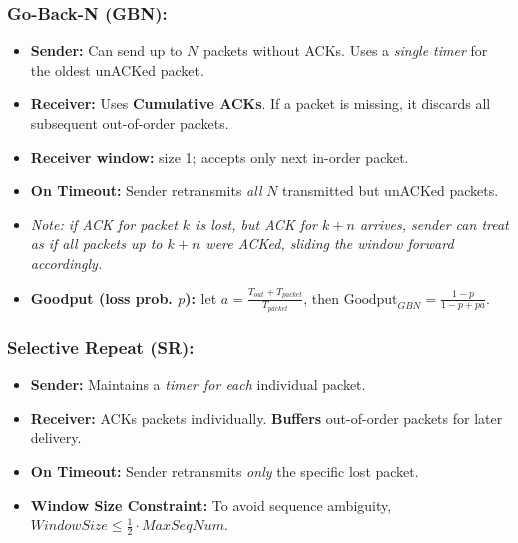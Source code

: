 \subsubsection{Go-Back-N (GBN):}
\begin{itemize}
	\item \textbf{Sender:} Can send up to $N$ packets without ACKs. Uses a \textit{single timer} for the oldest unACKed packet.
	\item \textbf{Receiver:} Uses \textbf{Cumulative ACKs}. If a packet is missing, it discards all subsequent out-of-order packets.
	\item \textbf{Receiver window:} size 1; accepts only next in-order packet.
	\item \textbf{On Timeout:} Sender retransmits \textit{all} $N$ transmitted but unACKed packets.
	\item[] \textit{Note: if ACK for packet $k$ is lost, but ACK for $k+n$ arrives, sender can treat as if all packets up to $k+n$ were ACKed, sliding the window forward accordingly.}
	\item \textbf{Goodput (loss prob. $p$):} let $a=\frac{T_{out}+T_{packet}}{T_{packet}}$, then $\text{Goodput}_{GBN} = \frac{1-p}{1-p+p a}$.
\end{itemize}
\subsubsection{Selective Repeat (SR):}
\begin{itemize}
	\item \textbf{Sender:} Maintains a \textit{timer for each} individual packet.
	\item \textbf{Receiver:} ACKs packets individually. \textbf{Buffers} out-of-order packets for later delivery.
	\item \textbf{On Timeout:} Sender retransmits \textit{only} the specific lost packet.
	\item \textbf{Window Size Constraint:} To avoid sequence ambiguity, $WindowSize \le \frac{1}{2} \cdot MaxSeqNum$.
\end{itemize}

\begin{center}
\noindent{}
\end{center}

